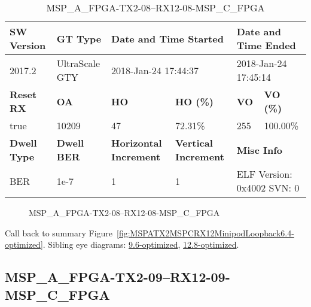 \begin{table}[h]
\centering
\caption{MSP\_A\_FPGA-TX2-08--RX12-08-MSP\_C\_FPGA}
\label{tab:MSPAFPGATX208RX1208MSPCFPGA6.4-optimized}
\begin{tabular}{@{}|l|l|l|l|l|l|@{}}
\toprule
\textbf{SW Version}                & \textbf{GT Type}   & \multicolumn{2}{l|}{\textbf{Date and Time Started}}            & \multicolumn{2}{l|}{\textbf{Date and Time Ended}}        \\ \midrule
2017.2                       & UltraScale GTY          & \multicolumn{2}{l|}{2018-Jan-24 17:44:37}                   & \multicolumn{2}{l|}{2018-Jan-24 17:45:14}               \\ \midrule
\textbf{Reset RX}                  & \textbf{OA} & \textbf{HO}   & \textbf{HO (\%)} & \textbf{VO} & \textbf{VO (\%)} \\ \midrule
true & 10209        & 47          & 72.31\%        & 255        & 100.00\%       \\ \midrule
\textbf{Dwell Type}                & \textbf{Dwell BER} & \textbf{Horizontal Increment} & \textbf{Vertical Increment}    & \multicolumn{2}{l|}{\textbf{Misc Info}}                  \\ \midrule
BER                            & 1e-7        & 1        & 1           & \multicolumn{2}{l|}{ELF Version: 0x4002 SVN: 0}                         \\ \bottomrule
\end{tabular}
\end{table}

\begin{figure}[h]
\caption{MSP\_A\_FPGA-TX2-08--RX12-08-MSP\_C\_FPGA} \label{fig:MSPAFPGATX208RX1208MSPCFPGA6.4-optimized}
\end{figure}

Call back to summary Figure~\ref{fig:MSPATX2MSPCRX12MinipodLoopback6.4-optimized}.
Sibling eye diagrams: \hyperref[sec:MSPAFPGATX208RX1208MSPCFPGA9.6-optimized]{9.6-optimized}, \hyperref[sec:MSPAFPGATX208RX1208MSPCFPGA12.8-optimized]{12.8-optimized}.

\clearpage
\newpage


\subsection{MSP\_A\_FPGA-TX2-09--RX12-09-MSP\_C\_FPGA}\label{sec:MSPAFPGATX209RX1209MSPCFPGA6.4-optimized}

